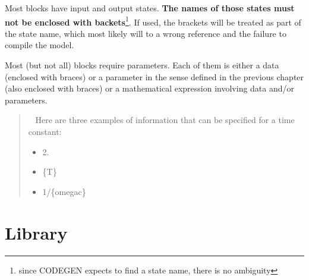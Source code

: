 Most blocks have input and output states. {\large \bf The names of those states must not be enclosed with backets}\footnote{since CODEGEN expects to find a state name, there is no ambiguity}. If used, the brackets will be treated as part of the state name, which most likely will to a wrong reference and the failure to compile the model.

Most (but not all) blocks require parameters. Each of them is either a data (enclosed with braces) or a parameter in the sense defined in the previous chapter (also enclosed with braces) or a mathematical expression involving data and/or parameters.

\begin{quote}
\faHandPointRight ~ \rm Here are three examples of information that can be specified for a time constant:
\begin{itemize}
\item[] 2.
\item[] \{T\}
\item[] 1/\{omegac\}
\end{itemize}
\end{quote}

\section{Library}





